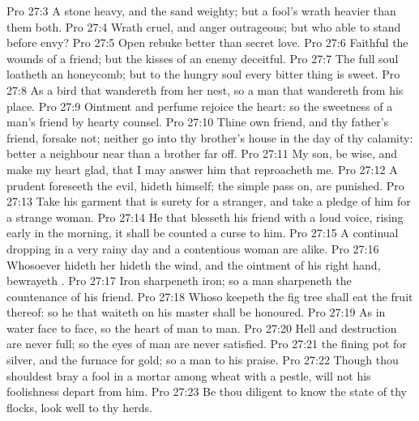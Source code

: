\vs Pro 27:3 A stone  heavy, and the sand weighty; but a fool's wrath  heavier than them both.
\vs Pro 27:4 Wrath  cruel, and anger  outrageous; but who  able to stand before envy?
\vs Pro 27:5 Open rebuke  better than secret love.
\vs Pro 27:6 Faithful  the wounds of a friend; but the kisses of an enemy  deceitful.
\vs Pro 27:7 The full soul loatheth an honeycomb; but to the hungry soul every bitter thing is sweet.
\vs Pro 27:8 As a bird that wandereth from her nest, so  a man that wandereth from his place.
\vs Pro 27:9 Ointment and perfume rejoice the heart: so  the sweetness of a man's friend by hearty counsel.
\vs Pro 27:10 Thine own friend, and thy father's friend, forsake not; neither go into thy brother's house in the day of thy calamity:  better  a neighbour  near than a brother far off.
\vs Pro 27:11 My son, be wise, and make my heart glad, that I may answer him that reproacheth me.
\vs Pro 27:12 A prudent  foreseeth the evil,  hideth himself;  the simple pass on,  are punished.
\vs Pro 27:13 Take his garment that is surety for a stranger, and take a pledge of him for a strange woman.
\vs Pro 27:14 He that blesseth his friend with a loud voice, rising early in the morning, it shall be counted a curse to him.
\vs Pro 27:15 A continual dropping in a very rainy day and a contentious woman are alike.
\vs Pro 27:16 Whosoever hideth her hideth the wind, and the ointment of his right hand,  bewrayeth .
\vs Pro 27:17 Iron sharpeneth iron; so a man sharpeneth the countenance of his friend.
\vs Pro 27:18 Whoso keepeth the fig tree shall eat the fruit thereof: so he that waiteth on his master shall be honoured.
\vs Pro 27:19 As in water face  to face, so the heart of man to man.
\vs Pro 27:20 Hell and destruction are never full; so the eyes of man are never satisfied.
\vs Pro 27:21  the fining pot for silver, and the furnace for gold; so  a man to his praise.
\vs Pro 27:22 Though thou shouldest bray a fool in a mortar among wheat with a pestle,  will not his foolishness depart from him.
\vs Pro 27:23 Be thou diligent to know the state of thy flocks,  look well to thy herds.
